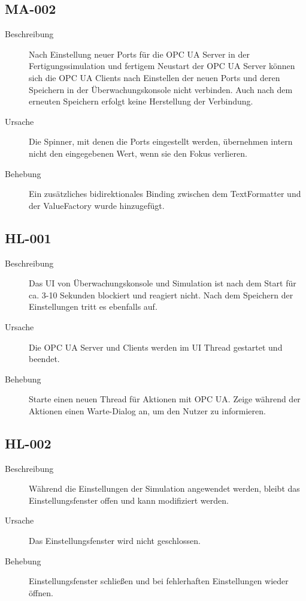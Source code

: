 \documentclass[parskip=full]{scrartcl}
\begin{document}
\subsection{MA-002}
\begin{description}
	\item[Beschreibung] Nach Einstellung neuer Ports für die OPC UA Server in der Fertigungssimulation und fertigem Neustart der OPC UA Server können sich die OPC UA Clients nach Einstellen der neuen Ports und deren Speichern in der Überwachungskonsole nicht verbinden. Auch nach dem erneuten Speichern erfolgt keine Herstellung der Verbindung.
	\item[Ursache] Die Spinner, mit denen die Ports eingestellt werden, übernehmen intern nicht den eingegebenen Wert, wenn sie den Fokus verlieren.
	\item[Behebung] Ein zusätzliches bidirektionales Binding zwischen dem TextFormatter und der ValueFactory wurde hinzugefügt.
\end{description}

\subsection{HL-001}
\begin{description}
	\item[Beschreibung] Das UI von Überwachungskonsole und Simulation ist nach dem Start für ca. 3-10 Sekunden blockiert und reagiert nicht. Nach dem Speichern der Einstellungen tritt es ebenfalls auf.
	\item[Ursache] Die OPC UA Server und Clients werden im UI Thread gestartet und beendet.
	\item[Behebung] Starte einen neuen Thread für Aktionen mit OPC UA. Zeige während der Aktionen einen Warte-Dialog an, um den Nutzer zu informieren.
\end{description}

\subsection{HL-002}
\begin{description}
	\item[Beschreibung] Während die Einstellungen der Simulation angewendet werden, bleibt das Einstellungsfenster offen und kann modifiziert werden.
	\item[Ursache] Das Einstellungsfenster wird nicht geschlossen.
	\item[Behebung] Einstellungsfenster schließen und bei fehlerhaften Einstellungen wieder öffnen.
\end{description}
\end{document}
